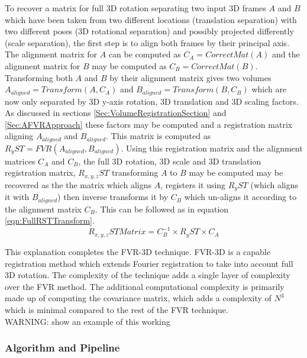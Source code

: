 To recover a matrix for full 3D rotation separating two input 3D frames $A$ and $B$ which have been taken from two different locations (translation separation) with two different poses (3D rotational separation) and possibly projected differently (scale separation), the first step is to align both frames by their principal axis. The alignment matrix for $A$ can be computed as $C_A = CorrectMat(A)$ and the alignment matrix for $B$ may be computed as $C_B = CorrectMat(B)$. Transforming both $A$ and $B$ by their alignment matrix gives two volumes $A_{aligned} = Transform(A, C_A)$ and $B_{aligned} = Transform(B, C_B)$ which are now only separated by 3D y-axis rotation, 3D translation and 3D scaling factors. As discussed in sections \ref{Sec:VolumeRegistrationSection} and \ref{Sec:AFVRApproach} these factors may be computed and a registration matrix aligning $A_{aligned}$ and $B_{aligned}$. This matrix is computed as $R_{y}ST = FVR(A_{aligned},B_{aligned})$. Using this registration matrix and the alignment matrices $C_{A}$ and $C_{B}$, the full 3D rotation, 3D scale and 3D translation registration matrix, $R_{x,y,z}ST$ transforming $A$ to $B$ may be computed may be recovered as the the matrix which aligns $A$, registers it using $R_{y}ST$ (which aligns it with $B_{aligned}$) then inverse transforms it by $C_{B}$ which un-aligns it according to the alignment matrix $C_B$. This can be followed as in equation \ref{eqn:FullRSTTransform}. \\ 

\begin{equation} \label{eqn:FullRSTTransform}
R_{x,y,z}ST Matrix = C_{B}^{-1} \times R_{y}ST \times C_A
\end{equation}

This explanation completes the FVR-3D technique. FVR-3D is a capable registration method which extends Fourier registration to take into account full 3D rotation. The complexity of the technique adds a single layer of complexity over the FVR method. The additional computational complexity is primarily made up of computing the covariance matrix, which adds a complexity of $N^3$ which is minimal compared to the rest of the FVR technique. \\


WARNING: show an example of this working

\subsubsection{Algorithm and Pipeline}

